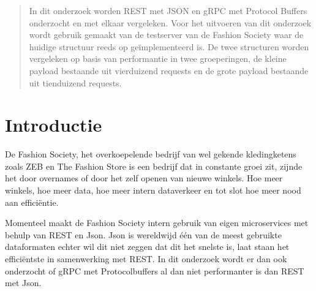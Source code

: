 \documentclass[a0,portrait]{a0poster}
\begin{document}
\begin{multicols}{2} %


\color{HoGentAccent1} %

\begin{abstract}
In dit onderzoek worden REST met JSON en gRPC met Protocol Buffers onderzocht en met elkaar vergeleken. Voor het uitvoeren van dit onderzoek wordt gebruik gemaakt van de testserver van de Fashion Society waar de huidige structuur reeds op geïmplementeerd is. De twee structuren worden vergeleken op basis van performantie in twee groeperingen, de kleine payload bestaande uit vierduizend requests en de grote payload bestaande uit tienduizend requests.
\end{abstract}

\color{HoGentAccent1} 
\section*{Introductie}
\color{black}
\color{black}
De Fashion Society, het overkoepelende bedrijf van wel gekende kledingketens zoals ZEB en The Fashion Store is een bedrijf dat in constante groei zit, zijnde het door overnames of door het zelf openen van nieuwe winkels. Hoe meer winkels, hoe meer data, hoe meer intern dataverkeer en tot slot hoe meer nood aan efficiëntie.

Momenteel maakt de Fashion Society intern gebruik van eigen microservices met behulp van REST en Json. Json is wereldwijd één van de meest gebruikte dataformaten echter wil dit niet zeggen dat dit het snelste is, laat staan het efficiëntste in samenwerking met REST. In dit onderzoek wordt er dan ook onderzocht of gRPC met Protocolbuffers al dan niet performanter is dan REST met Json.


\end{multicols}
\end{document}
